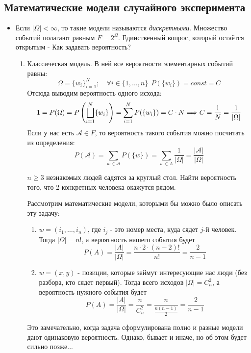 \subsection{Математические модели случайного эксперимента}

\begin{itemize}
	\item Если $|\Omega| < \infty$, то такие модели называются \textit{дискретными}. Множество событий полагают равным $F = 2^\Omega$. Единственный вопрос, который остаётся открытым - Как задавать вероятность?
	\begin{enumerate}
		\item Классическая модель. В ней все вероятности элементарных событий равны:
		\[
			\Omega = \{w_i\}_{i = 1}^N; \quad \forall i \in \{1, \ldots, n\}\ \ P(\{w_i\}) = const = C
		\]
		Отсюда выводим вероятность одного исхода:
		\[
			1 = P(\Omega) = P\left(\bigsqcup_{i = 1}^N \{w_i\}\right) = \sum_{i = 1}^N P(\{w_i\}) = C \cdot N \Longrightarrow C = \frac{1}{N} = \frac{1}{|\Omega|}
		\]
		Если у нас есть $\mathcal{A} \in F$, то вероятность такого события можно посчитать из определения:
		\[
			P(\mathcal{A}) = \sum_{w \in \mathcal{A}} P(\{w\}) = \sum_{w \in A} \frac{1}{|\Omega|} = \frac{|\mathcal{A}|}{|\Omega|}
		\]
		\begin{example}
			$n \ge 3$ незнакомых людей садятся за круглый стол. Найти вероятность того, что 2 конкретных человека окажутся рядом.
			
			Рассмотрим математические модели, которыми бы можно было описать эту задачу:
			\begin{enumerate}
				\item $w = (i_1, \ldots, i_n)$, где $i_j$ - это номер места, куда сядет $j$-й человек. Тогда $|\Omega| = n!$, а вероятность нашего события будет
				\[
					P(A) = \frac{|A|}{|\Omega|} = \frac{n \cdot 2 \cdot (n - 2)!}{n!} = \frac{2}{n - 1}
				\]
				
				\item $w = (x, y)$ - позиции, которые займут интересующие нас люди (без разбора, кто сядет первый). Тогда всего исходов $|\Omega| = C_n^2$, а вероятность нужного события будет
				\[
					P(A) = \frac{|A|}{|\Omega|} = \frac{n}{C_n^2} = \frac{n}{\frac{n(n - 1)}{2}} = \frac{2}{n - 1}
				\]
			\end{enumerate}
		\end{example}
	
		\begin{note}
			Это замечательно, когда задача сформулирована полно и разные модели дают одинаковую вероятность. Однако, бывает и иначе, но об этом будет сильно позже...
		\end{note}
	

\end{enumerate}
\end{itemize}
